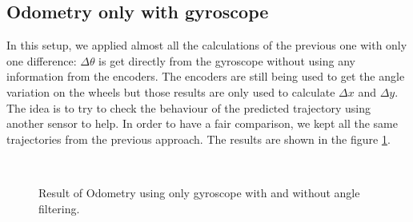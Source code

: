 \documentclass[twoside,conference,a4paper]{IEEEtran}
\begin{document}
\subsection{Odometry only with gyroscope}
In this setup, we applied almost all the calculations of the previous one with only one difference: $ \Delta \theta $ is
get directly from the gyroscope without using any information from the encoders. The encoders are still being used to get
the angle variation on the wheels but those results are only used to calculate $ \Delta x $ and $ \Delta y $. The idea
is to try to check the behaviour of the predicted trajectory using another sensor to help. In order to have a fair comparison,
we kept all the same trajectories from the previous approach. The results are shown in the figure \ref{fig:encoders_gyroscope}.

\begin{figure}[h]
\begin{center}
{} \hspace{0.1cm}
 \\
\caption{Result of Odometry using only gyroscope with and without angle filtering.}
\label{fig:encoders_gyroscope}
\end{center}
\end{figure}
\end{document}
